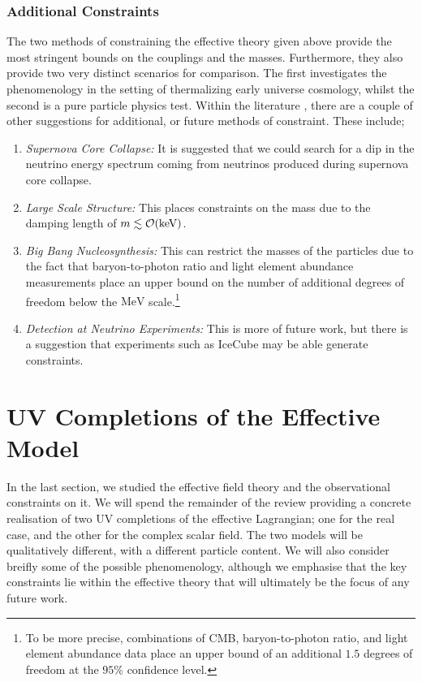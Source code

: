 \documentclass[10pt]{article}
\begin{document}
\subsubsection{Additional Constraints}
The two methods of constraining the effective theory given above provide the most stringent bounds on the couplings and the masses. Furthermore, they also provide two very distinct scenarios for comparison. The first investigates the phenomenology in the setting of thermalizing early universe cosmology, whilst the second is a pure particle physics test. Within the literature \cite{Farzan2010, Boehm2006}, there are a couple of other suggestions for additional, or future methods of constraint. These include;
\begin{enumerate}
  \item \textit{Supernova Core Collapse:} It is suggested \cite{Franarin2018, Farzan2010} that we could search for a dip in the neutrino energy spectrum coming from neutrinos produced during supernova core collapse.
  \item \textit{Large Scale Structure:} This places constraints on the mass \cite{Boehm2004} due to the damping length of $m \lesssim \mathcal{O}(\text{keV})$.
  \item \textit{Big Bang Nucleosynthesis:} This can restrict the masses of the particles \cite{Boehm2006} due to the fact that baryon-to-photon ratio and light element abundance measurements place an upper bound on the number of additional degrees of freedom below the $\text{MeV}$ scale.\footnote{To be more precise, combinations of CMB, baryon-to-photon ratio, and light element abundance data place an upper bound of an additional $1.5$ degrees of freedom at the $95$\% confidence level.}
  \item \textit{Detection at Neutrino Experiments:} This is more of future work, but there is a suggestion \cite{Farzan2010} that experiments such as IceCube may be able generate constraints.
\end{enumerate}
\section{UV Completions of the Effective Model} \label{sec:UV completions}
In the last section, we studied the effective field theory and the observational constraints on it. We will spend the remainder of the review providing a concrete realisation of two UV completions of the effective Lagrangian; one for the real case, and the other for the complex scalar field. The two models will be qualitatively different, with a different particle content. We will also consider breifly some of the possible phenomenology, although we emphasise that the key constraints lie within the effective theory that will ultimately be the focus of any future work.
\end{document}
